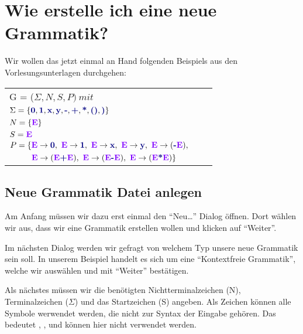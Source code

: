 \chapter{Wie erstelle ich eine neue Grammatik?}\label{Grammar}

Wir wollen das jetzt einmal an Hand folgenden Beispiels aus den
Vorlesungsunterlagen durchgehen:\vspace{10pt}


\begin{tabular}{lcr}
G = ($\Sigma, N, S, P )\ mit $\\
	$\Sigma = \{\TerminalSymbol{0}, \TerminalSymbol{1}, \TerminalSymbol{x},
	\TerminalSymbol{y}, \TerminalSymbol{-}, \TerminalSymbol{+},
	\TerminalSymbol{*}, \TerminalSymbol{()}, \TerminalSymbol{)}\}$\\ $N =
	\{\StartSymbol{E}\}$\\ $S=\StartSymbol{E}$\\ 
	$P = \{\StartSymbol{E} \to \TerminalSymbol{0},\ \StartSymbol{E} \to \TerminalSymbol{1},\ 
	\StartSymbol{E}	\to \TerminalSymbol{x},\ \StartSymbol{E} \to \TerminalSymbol{y},\ 
	\StartSymbol{E} \to (\TerminalSymbol{-}\StartSymbol{E}),$\\ 
	$\ \ \ \ \ \ \ \ \StartSymbol{E} \to (\StartSymbol{E} \TerminalSymbol{+}
	\StartSymbol{E}),\ \StartSymbol{E} \to (\StartSymbol{E} \TerminalSymbol{-} \StartSymbol{E}),\
	\StartSymbol{E} \to (\StartSymbol{E} \TerminalSymbol{*} \StartSymbol{E})\}$\\
\end{tabular}

\section{Neue Grammatik Datei anlegen}
 
Am Anfang müssen wir dazu erst einmal den "`Neu\ldots"' Dialog öffnen. Dort
wählen wir aus, dass wir eine Grammatik erstellen wollen und klicken auf
"`Weiter"'.\vspace{10pt}

Im nächsten Dialog werden wir gefragt von welchem Typ unsere neue Grammatik
sein soll. In unserem Beispiel handelt es sich um eine "`Kontextfreie
Grammatik"', welche wir auswählen und mit "`Weiter"' bestätigen.\vspace{10pt}

Als nächstes müssen wir die benötigten Nichtterminalzeichen (N),
Terminalzeichen ($\Sigma$) und das Startzeichen (S) angeben.  Als Zeichen
können alle Symbole werwendet werden, die nicht zur Syntax der Eingabe gehören.
Das bedeutet \Symbol{,}, \Symbol{\{}, \Symbol{\}} und \SymbolEmpty{}
können hier nicht verwendet werden.\vspace{10pt}

